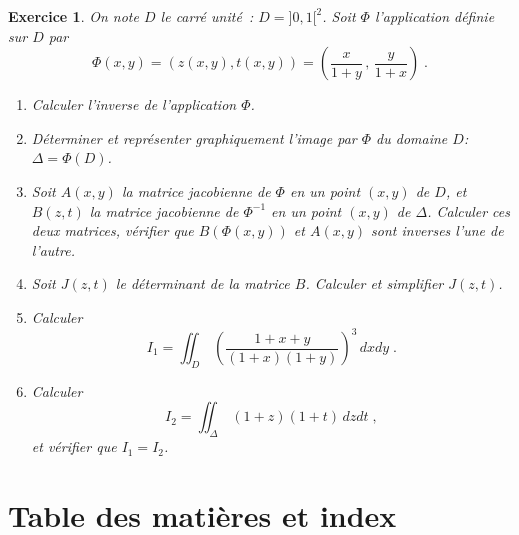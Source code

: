 \documentclass{article}
\newtheorem{exo}{Exercice}[section]
\begin{document}
\begin{exo}{\rm
On note $D$ le carr\'e unit\'e~: $D=]0,1[^2$. Soit $\Phi$
l'application d\'efinie sur $D$ par
$$
\Phi(x,y) = (z(x,y),t(x,y))=
\left(\frac{x}{1+y}\,,\,\frac{y}{1+x}\right)\;.
$$
\begin{enumerate}
\item
Calculer l'inverse de l'application $\Phi$.
\item
D\'eterminer et repr\'esenter graphiquement 
l'image par $\Phi$ du domaine $D$: $\Delta=\Phi(D)$.
\item
Soit $A(x,y)$ la matrice jacobienne de $\Phi$ en un point $(x,y)$ de
$D$, et $B(z,t)$ la matrice jacobienne de $\Phi^{-1}$ en un point $(x,y)$ de
$\Delta$. Calculer ces deux matrices, v\'erifier que $B(\Phi(x,y))$ et
$A(x,y)$ sont inverses l'une de l'autre.
\item
Soit $J(z,t)$ le d\'eterminant de la matrice $B$. Calculer et
simplifier $J(z,t)$.
\item
Calculer
$$
I_1=\iint_D\,\left( \frac{1+x+y}{(1+x)(1+y)} \right)^3 \,dxdy\;.
$$  
\item
Calculer
$$
I_2=\iint_\Delta\,(1+z)(1+t)\,dzdt\;,
$$  
et v\'erifier que $I_1=I_2$.
\end{enumerate}
}\end{exo}
\newpage
\appendix

\section{Table des mati\`eres et index} \label{sec:appendice}

\tableofcontents


\printindex
\end{document}

